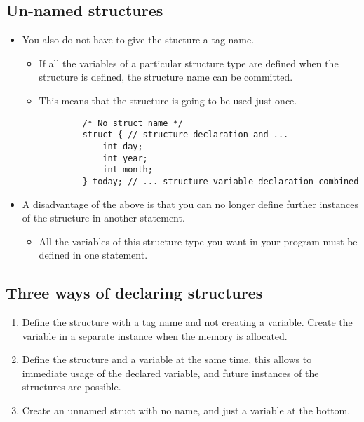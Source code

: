 \subsection{Un-named structures}
\begin{itemize}
    \item You also do not have to give the stucture a tag name.
        \begin{itemize}
            \item If all the variables of a particular structure type are defined when the structure is defined, the structure name can be committed. 
            \item This means that the structure is going to be used just once. 
        \end{itemize}
        \begin{verbatim}
            /* No struct name */
            struct { // structure declaration and ...
                int day;
                int year;
                int month;
            } today; // ... structure variable declaration combined
        \end{verbatim}
    
    \item A disadvantage of the above is that you can no longer define further instances of the structure in another statement.
        \begin{itemize}
            \item All the variables of this structure type you want in your program must be defined in one statement. 
        \end{itemize}
\end{itemize}

\subsection*{Three ways of declaring structures}
\begin{enumerate}
    \item Define the structure with a tag name and not creating a variable. Create the variable in a separate instance when the memory is allocated.
    \item Define the structure and a variable at the same time, this allows to immediate usage of the declared variable, and future instances of the structures are possible.
    \item Create an unnamed struct with no name, and just a variable at the bottom. 
\end{enumerate}

